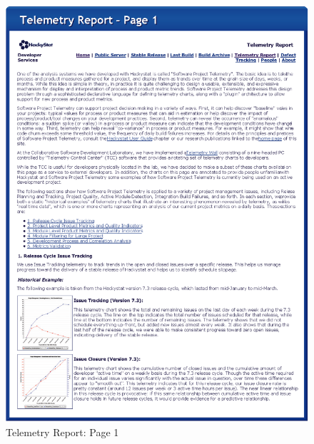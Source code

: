 \begin{figure}[p]
  \center
  \includegraphics[height=0.93\textheight]{figures/TelemetryReport-Page1}
  \caption{Telemetry Report: Page 1} 
  \label{figures/TelemetryReport-Page1}
\end{figure}

